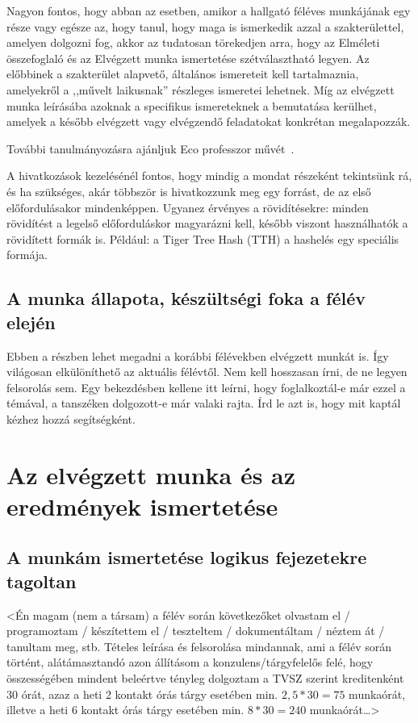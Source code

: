 \documentclass[a4paper,oneside]{article}
\begin{document}
Nagyon fontos, hogy abban az esetben, amikor a hallgató féléves
munkájának egy része vagy egésze az, hogy tanul, hogy maga is
ismerkedik azzal a szakterülettel, amelyen dolgozni fog, akkor az
tudatosan törekedjen arra, hogy az Elméleti összefoglaló és az
Elvégzett munka ismertetése szétválasztható legyen.  Az előbbinek a
szakterület alapvető, általános ismereteit kell tartalmaznia,
amelyekről a ,,művelt laikusnak'' részleges ismeretei lehetnek.  Míg
az elvégzett munka leírásába azoknak a specifikus ismereteknek a
bemutatása kerülhet, amelyek a később elvégzett vagy elvégzendő
feladatokat konkrétan megalapozzák.

További tanulmányozásra ajánljuk Eco professzor művét~\cite{eco}.

A hivatkozások kezelésénél fontos, hogy mindig a mondat részeként
tekintsünk rá, és ha szükséges, akár többször is hivatkozzunk meg egy
forrást, de az első előfordulásakor mindenképpen.  Ugyanez érvényes a
rövidítésekre: minden rövidítést a legelső előforduláskor magyarázni
kell, később viszont használhatók a rövidített formák is.  Például: a
Tiger Tree Hash (TTH) a hashelés egy speciális formája.

\subsection{A munka állapota, készültségi foka a félév elején}
\label{sec:munka-allap-kesz}

Ebben a részben lehet megadni a korábbi félévekben elvégzett munkát
is.  Így világosan elkülöníthető az aktuális félévtől.  Nem kell
hosszasan írni, de ne legyen felsorolás sem.  Egy bekezdésben kellene
itt leírni, hogy foglalkoztál-e már ezzel a témával, a tanszéken
dolgozott-e már valaki rajta.  Írd le azt is, hogy mit kaptál kézhez
hozzá segítségként.

\newpage
\section{Az elvégzett munka és az eredmények ismertetése}
\label{sec:az-elvegzett-munka}


\subsection{A munkám ismertetése logikus fejezetekre tagoltan}
\label{sec:a-munkam-ismert}
<Én magam (nem a társam) a félév során következőket olvastam el /
programoztam / készítettem el / teszteltem / dokumentáltam / néztem át
/ tanultam meg, stb.  Tételes leírása és felsorolása mindannak, ami a
félév során történt, alátámasztandó azon állításom a
konzulens/tárgyfelelős felé, hogy összességében mindent beleértve
tényleg dolgoztam a TVSZ szerint kreditenként 30 órát, azaz a heti 2
kontakt órás tárgy esetében min. $2,5*30 = 75$ munkaórát, illetve a
heti 6 kontakt órás tárgy esetében min. $8*30 = 240$ munkaórát\dots>
\end{document}
